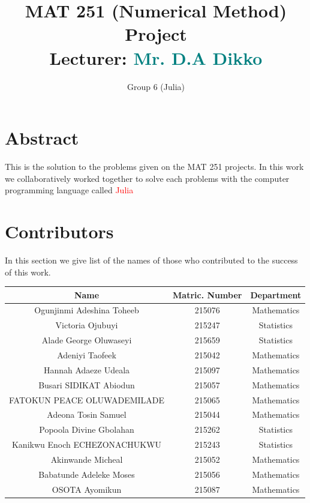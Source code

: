 \documentclass[a4paper,12pt,openany]{book}
\begin{document}
	\title{MAT 251 (Numerical Method) Project\\[2\baselineskip]
	Lecturer: \textcolor{teal}{Mr. D.A Dikko} }
	\author{\Large{Group 6 (Julia)}}
	\date{}
	\maketitle
	
	\section{Abstract}
		This is the solution to the problems given on the MAT 251 projects. In this work we collaboratively worked together to solve each problems with the computer programming language called \textcolor{red}{Julia}
	\section{Contributors}
	In this section we give list of the names of those who contributed to the success of this work.
	
	
	\begin{tabular}{|c|c|c|}
		\hline
		Name & Matric. Number & Department \\
		\hline
		Ogunjinmi Adeshina Toheeb & 215076 & Mathematics\\
		\hline
		Victoria Ojubuyi & 215247 & Statistics\\
		\hline
		Alade George Oluwaseyi & 215659 & Statistics \\
		\hline 
		Adeniyi Taofeek & 215042 & Mathematics\\
		\hline
		Hannah Adaeze Udeala & 215097 & Mathematics \\
		\hline 
		Busari SIDIKAT Abiodun & 215057 & Mathematics \\
		\hline
		FATOKUN PEACE OLUWADEMILADE & 215065 & Mathematics \\
		\hline 
		Adeona Tosin Samuel & 215044 & Mathematics \\
		\hline
		Popoola Divine Gbolahan & 215262 & Statistics \\
		\hline 
		Kanikwu Enoch ECHEZONACHUKWU & 215243 & Statistics \\
		\hline 
		Akinwande Micheal & 215052 & Mathematics \\
		\hline
		Babatunde Adeleke Moses & 215056 & Mathematics \\
		\hline
		OSOTA Ayomikun & 215087 & Mathematics \\
		\hline
	\end{tabular}
\newpage
\tableofcontents
\newpage
\end{document}
